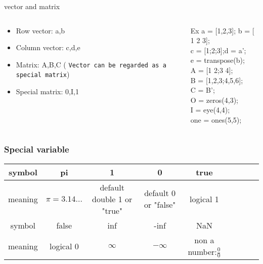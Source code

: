 \documentclass[aspectratio=169]{beamer}
\begin{document}
\begin{frame}{vector and matrix}
  \begin{columns}
    \begin{column}{0.4\linewidth}
      \begin{itemize}
        \item   Row vector:  a,b
              
        \item Column vector: c,d,e
              
        \item Matrix: A,B,C ({\color{red} \small \tt Vector can be regarded as a special matrix})
        \item Special matrix: 0,I,1
      \end{itemize}
    \end{column}
    \begin{column}{0.4\linewidth}
      \begin{exampleblock}{Ex}
         a = [1,2,3];
    b = [ 1 2 3];\\
    c = [1;2;3];d = a';\\
    e = transpose(b);\\
    A = [1 2;3 4];\\
    B = [1,2,3;4,5,6];\\
    C = B';\\
    O = zeros(4,3);\\
    I = eye(4,4);\\
    one = ones(5,5);\\
      \end{exampleblock}
  \end{column}
\end{columns}
\end{frame}
\begin{frame}
  \frametitle{Special variable}
  \begin{table}
    \centering
    \tiny
    \begin{tabular}{ccccccccc}\toprule
      symbol &pi&1&0&true\\\midrule
      meaning& $\pi=3.14\ldots$&default double 1 or "true"& default 0 or "false"& logical 1\\\midrule
     symbol &false& inf& -inf & NaN\\\midrule
     meaning&logical 0 &$\infty$&$-\infty$&non a number:$\frac{0}{0}$\\\bottomrule
    \end{tabular}
  \end{table}
\end{frame}
\end{document}
